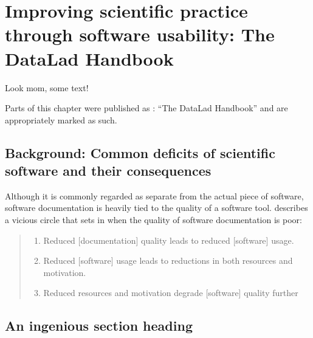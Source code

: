 

\chapter{Improving scientific practice through software usability: The DataLad Handbook}
\label{chap:k2}

Look mom, some text!

Parts of this chapter were published as \citet{wagner2020datalad}: ``The DataLad Handbook'' and are appropriately marked as such.


\section{Background: Common deficits of scientific software and their consequences}

Although it is commonly regarded as separate from the actual piece of software, software documentation is heavily tied to the quality of a software tool.
\citet{Parnas2011} describes a vicious circle that sets in when the quality of software documentation is poor:

\begin{quote}
\begin{enumerate}
\item Reduced [documentation] quality leads to reduced [software] usage.
\item Reduced [software] usage leads to reductions in both resources and motivation.
\item Reduced resources and motivation degrade [software] quality further
\end{enumerate}
\end{quote}

\pagebreak

\section{An ingenious section heading}
\pagebreak

